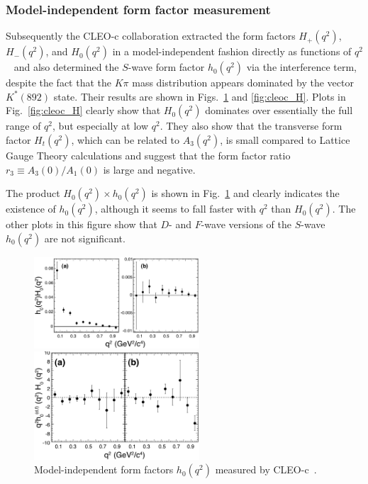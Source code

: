 \subsubsection{Model-independent form factor measurement}

Subsequently the CLEO-c collaboration extracted the form factors
$H_+(q^2)$, $H_-(q^2)$, and $H_0(q^2)$ in a model-independent fashion
directly as functions of $q^2$~\cite{Briere:2010zc} and also determined the
$S$-wave form factor $h_0(q^2)$ via the interference term, despite the
fact that the $K\pi$ mass distribution appears dominated by the vector
$K^*(892)$ state. Their results are shown in 
Figs.~\ref{fig:cleoc_h0} and \ref{fig:cleoc_H}.  Plots in Fig.~\ref{fig:cleoc_H} clearly show that
$H_0(q^2)$ dominates over essentially the full range of $q^2$, but
especially at low $q^2$. They also show that the transverse form factor
$H_t(q^2)$, which can be related to $A_3(q^2)$, is small compared to
Lattice Gauge Theory calculations and suggest that the form factor
ratio $r_3 \equiv A_3(0) / A_1(0)$ is large and negative.

The product $H_0(q^2)\times h_0(q^2)$ is shown in
Fig.~\ref{fig:cleoc_h0} and clearly indicates the existence of
$h_0(q^2)$, although it seems to fall faster with $q^2$ than $H_0(q^2)$.
The other plots in this figure show that $D$- and $F$-wave versions of
the $S$-wave $h_0(q^2)$ are not significant.

\begin{figure}[htb]
  \begin{center}
    \vskip0.20in
    \includegraphics[width=0.55\textwidth]{figures/charm/sl_cleoc_h0.pdf}
  \end{center}
  \begin{center}
    \vskip0.20in
    \includegraphics[width=0.55\textwidth]{figures/charm/sl_cleoc_h0df.pdf}
  \end{center}
\vskip-0.20in
  \caption{Model-independent form factors $h_0(q^2)$ measured by 
    CLEO-c~\cite{Briere:2010zc}.
  \label{fig:cleoc_h0}}
\end{figure}

